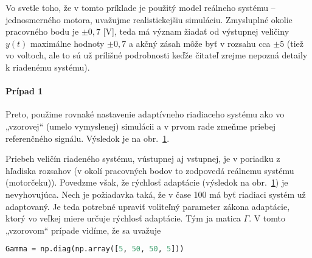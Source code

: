 \documentclass[a4paper, 10pt, ]{article}
\begin{document}
Vo svetle toho, že v tomto príklade je použitý model reálneho systému -- jednosmerného motora, uvažujme realistickejšiu simuláciu. Zmysluplné okolie pracovného bodu je $\pm 0,7$ [V], teda má význam žiadať od výstupnej veličiny $y(t)$ maximálne hodnoty $\pm 0,7$ a akčný zásah môže byť v rozsahu cca $\pm 5$ (tiež vo voltoch, ale to sú už prílišné podrobnosti keďže čitateľ zrejme nepozná detaily k riadenému systému).














\paragraph{Prípad 1}



Preto, použime rovnaké nastavenie adaptívneho riadiaceho systému ako vo „vzorovej“ (umelo vymyslenej) simulácii a v prvom rade zmeňme priebej referenčného signálu. Výsledok je na obr.~\ref{figsc_ar06_MRAC_2}.




Priebeh veličín riadeného systému, vústupnej aj vstupnej, je v poriadku z hľadiska rozsahov (v okolí pracovných bodov to zodpovedá reálnemu systému (motorčeku)). Povedzme však, že rýchlosť adaptácie (výsledok na obr.~\ref{figsc_ar06_MRAC_2}) je nevyhovujúca. Nech je požiadavka taká, že v čase 100 má byť riadiaci systém už adaptovaný. Je teda potrebné upraviť voliteľný parameter zákona adaptácie, ktorý vo veľkej miere určuje rýchlosť adaptácie. Tým ja matica $\Gamma$. V tomto „vzorovom“ prípade vidíme, že sa uvažuje
\begin{lstlisting}[language=Python,
                    numbers=none,
                    ]
Gamma = np.diag(np.array([5, 50, 50, 5]))
\end{lstlisting}












\begin{figure}[!t]
	\centering

    \vspace{-3mm}


    \vspace{-2mm}

	\caption{}
	\label{figsc_ar06_MRAC_2}


    \vspace{-2mm}

\end{figure}
\end{document}
